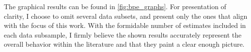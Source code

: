 The graphical results can be found in
\autoref{fig:bpe_graphs}. For presentation of clarity, I choose to omit several data subsets, and present only the ones that align with the focus of this work. With the formidable number of estimates included in each data subsample, I firmly believe the shown results accurately represent the overall behavior within the literature and that they paint a clear enough picture.




